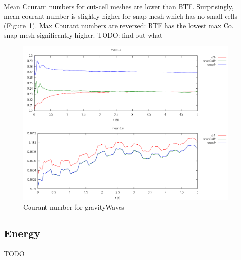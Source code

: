 Mean Courant numbers for cut-cell meshes are lower than BTF.  Surprisingly, mean courant number is slightly higher for snap mesh which has no small cells (Figure~\ref{fig:gw:courant}).  Max Courant numbers are reversed: BTF has the lowest max Co, snap mesh significantly higher.  TODO: find out what 

\begin{figure}
	\includegraphics[width=\textwidth]{interim-results/gravityWavesCourants.png}
	\caption{Courant number for gravityWaves}
	\label{fig:gw:courant}
\end{figure}

\subsection{Energy}
TODO
